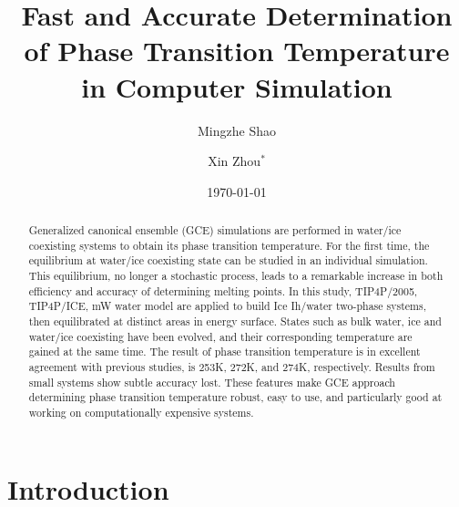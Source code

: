 \documentclass[aps,prl,twocolumn,superscriptaddress]{revtex4-1}
\begin{document}
\title{Fast and Accurate Determination of Phase Transition Temperature in Computer Simulation}

\author{Mingzhe Shao}

\author{Xin Zhou$^{*}$}

\date{\today}
 

\begin{abstract}  
Generalized canonical ensemble (GCE) simulations are performed in water/ice coexisting systems to obtain its phase transition temperature. For the first time, the equilibrium at water/ice coexisting state can be studied in an individual simulation. This equilibrium, no longer a stochastic process, leads to a remarkable increase in both efficiency and accuracy of determining melting points. In this study, TIP4P/2005, TIP4P/ICE, mW water model are applied to build Ice Ih/water two-phase systems, then equilibrated at distinct areas in energy surface. States such as bulk water, ice and water/ice coexisting have been evolved, and their corresponding temperature are gained at the same time. The result of phase transition temperature is in excellent agreement with previous studies, is 253K, 272K, and 274K, respectively. Results from small systems show subtle accuracy lost.  These features make GCE approach 
determining phase transition temperature robust, easy to use, and particularly good at working on computationally expensive systems.
\end{abstract}

\pacs{ } 

\maketitle{}
\section{Introduction}
\end{document}
